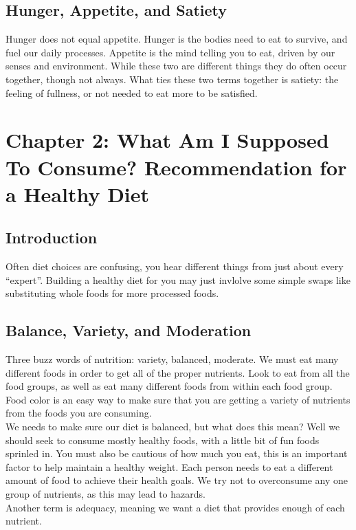 \documentclass[letterpaper, 11pt]{article}
\begin{document}
\subsection{Hunger, Appetite, and Satiety}
\label{sec:orgfa8e800}
Hunger does not equal appetite. Hunger is the bodies need to eat to survive, and fuel our daily processes. Appetite is the mind telling you to eat, driven by our senses and environment. While these two are different things they do often occur together, though not always. What ties these two terms together is satiety: the feeling of fullness, or not needed to eat more to be satisfied.\\
\section{Chapter 2: What Am I Supposed To Consume? Recommendation for a Healthy Diet}
\label{sec:orga526a5e}
\subsection{Introduction}
\label{sec:orgdce59ea}
Often diet choices are confusing, you hear different things from just about every ``expert''. Building a healthy diet for you may just invlolve some simple swaps like substituting whole foods for more processed foods.\\
\subsection{Balance, Variety, and Moderation}
\label{sec:orgc220113}
Three buzz words of nutrition: variety, balanced, moderate. We must eat many different foods in order to get all of the proper nutrients. Look to eat from all the food groups, as well as eat many different foods from within each food group. Food color is an easy way to make sure that you are getting a variety of nutrients from the foods you are consuming.\\
We needs to make sure our diet is balanced, but what does this mean? Well we should seek to consume mostly healthy foods, with a little bit of fun foods sprinled in. You must also be cautious of how much you eat, this is an important factor to help maintain a healthy weight. Each person needs to eat a different amount of food to achieve their health goals. We try not to overconsume any one group of nutrients, as this may lead to hazards.\\
Another term is adequacy, meaning we want a diet that provides enough of each nutrient.\\
\end{document}
